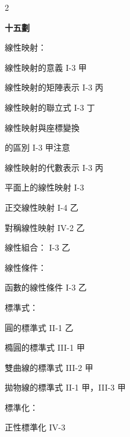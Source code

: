 \begin{multicols}{2}
\vspace{0.8em}
\begin{center}
\textbf{\large 十五劃}
\end{center}

\noindent 線性映射：\par
\noindent\hspace*{1.5em} 線性映射的意義 \hfill I-3 甲\par
\noindent\hspace*{1.5em} 線性映射的矩陣表示 \hfill I-3 丙\par
\noindent\hspace*{1.5em} 線性映射的聯立式 \hfill I-3 丁\par
\noindent\hspace*{1.5em} 線性映射與座標變換\par
\noindent\hspace*{1.5em} 的區別 \hfill I-3 甲注意\par
\noindent\hspace*{1.5em} 線性映射的代數表示 \hfill I-3 丙\par
\noindent\hspace*{1.5em} 平面上的線性映射 \hfill I-3\par
\noindent\hspace*{1.5em} 正交線性映射 \hfill I-4 乙\par
\noindent\hspace*{1.5em} 對稱線性映射 \hfill IV-2 乙\par
\noindent 線性組合： \hfill I-3 乙\par
\noindent 線性條件：\par
\noindent\hspace*{1.5em} 函數的線性條件 \hfill I-3 乙\par
\noindent 標準式：\par
\noindent\hspace*{1.5em} 圓的標準式 \hfill II-1 乙\par
\noindent\hspace*{1.5em} 橢圓的標準式 \hfill III-1 甲\par
\noindent\hspace*{1.5em} 雙曲線的標準式 \hfill III-2 甲\par
\noindent\hspace*{1.5em} 拋物線的標準式 \hfill II-1 甲，III-3 甲\par
\noindent 標準化：\par
\noindent\hspace*{1.5em} 正性標準化 \hfill IV-3\par

\end{multicols}
